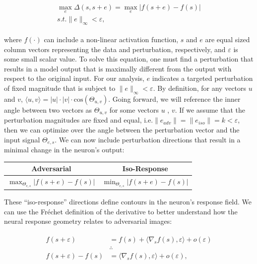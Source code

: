 \begin{align}\label{eq:ch4_adv_metric}
\begin{split}
    \max_{e} \Delta (s, s+e) = \max_{e} |f(s+e) - f(s)| \\
    s.t. \|e\|_{\infty} < \varepsilon,
\end{split}
\end{align}

where $f(\cdot)$ can include a non-linear activation function, $s$ and $e$ are equal sized column vectors representing the data and perturbation, respectively, and $\varepsilon$ is some small scalar value. To solve this equation, one must find a perturbation that results in a model output that is maximally different from the output with respect to the original input. For our analysis, $e$ indicates a targeted perturbation of fixed magnitude that is subject to $\|e\|_{\infty}<\varepsilon$. By definition, for any vectors $u$ and $v$, $\langle u,v\rangle = |u| \cdot |v| \cdot \mathrm{cos}(\Theta_{u,v})$. Going forward, we will reference the inner angle between two vectors as $\Theta_{u,v}$ for some vectors $u$ , $v$. If we assume that the perturbation magnitudes are fixed and equal, i.e.$\|e_{adv}\| = \|e_{iso}\| = k < \varepsilon$, then we can optimize over the angle between the perturbation vector and the input signal $\Theta_{e,s}$. We can now include perturbation directions that result in a minimal change in the neuron's output:

\begin{center}
    \begin{tabular}{ |c | c| } \hline
     \textbf{Adversarial} & \textbf{Iso-Response} \\ \hline
     $\max_{\Theta_{e,s}}|f(s+e) - f(s)|$ & $\min_{\Theta_{e,s}} | f(s+e) - f(s) |$ \\ \hline
    \end{tabular}
\end{center}

These ``iso-response'' directions define contours in the neuron's response field. We can use the Fr\'{e}chet definition of the derivative to better understand how the neural response geometry relates to adversarial images:

\begin{align}\label{eq:ch4_frechet}
\begin{split}
    f(s+\varepsilon) &= f(s) + \langle\nabla_{s}f(s), \varepsilon\rangle + o(\varepsilon)\\
    &\therefore \\
    f(s+\varepsilon) - f(s) &= \langle\nabla_{s}f(s), \varepsilon\rangle+ o(\varepsilon),
\end{split}
\end{align}

